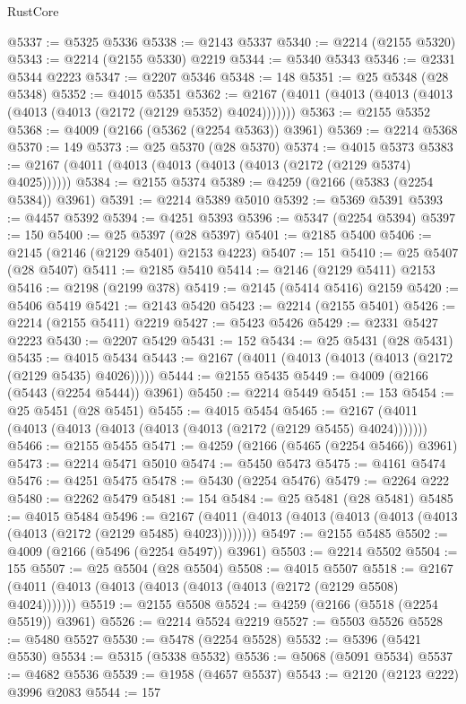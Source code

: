 \begin{lexlean}{RustCore}
\begin{coremodule}
@5337 := @5325 @5336
@5338 := @2143 @5337
@5340 := @2214 (@2155 @5320)
@5343 := @2214 (@2155 @5330) @2219
@5344 := @5340 @5343
@5346 := @2331 @5344 @2223
@5347 := @2207 @5346
@5348 := 148
@5351 := @25 @5348 (@28 @5348)
@5352 := @4015 @5351
@5362 := @2167 (@4011 (@4013 (@4013 (@4013 (@4013 (@4013 (@2172 (@2129 @5352) @4024)))))))
@5363 := @2155 @5352
@5368 := @4009 (@2166 (@5362 (@2254 @5363)) @3961)
@5369 := @2214 @5368
@5370 := 149
@5373 := @25 @5370 (@28 @5370)
@5374 := @4015 @5373
@5383 := @2167 (@4011 (@4013 (@4013 (@4013 (@4013 (@2172 (@2129 @5374) @4025))))))
@5384 := @2155 @5374
@5389 := @4259 (@2166 (@5383 (@2254 @5384)) @3961)
@5391 := @2214 @5389 @5010
@5392 := @5369 @5391
@5393 := @4457 @5392
@5394 := @4251 @5393
@5396 := @5347 (@2254 @5394)
@5397 := 150
@5400 := @25 @5397 (@28 @5397)
@5401 := @2185 @5400
@5406 := @2145 (@2146 (@2129 @5401) @2153 @4223)
@5407 := 151
@5410 := @25 @5407 (@28 @5407)
@5411 := @2185 @5410
@5414 := @2146 (@2129 @5411) @2153
@5416 := @2198 (@2199 @378)
@5419 := @2145 (@5414 @5416) @2159
@5420 := @5406 @5419
@5421 := @2143 @5420
@5423 := @2214 (@2155 @5401)
@5426 := @2214 (@2155 @5411) @2219
@5427 := @5423 @5426
@5429 := @2331 @5427 @2223
@5430 := @2207 @5429
@5431 := 152
@5434 := @25 @5431 (@28 @5431)
@5435 := @4015 @5434
@5443 := @2167 (@4011 (@4013 (@4013 (@4013 (@2172 (@2129 @5435) @4026)))))
@5444 := @2155 @5435
@5449 := @4009 (@2166 (@5443 (@2254 @5444)) @3961)
@5450 := @2214 @5449
@5451 := 153
@5454 := @25 @5451 (@28 @5451)
@5455 := @4015 @5454
@5465 := @2167 (@4011 (@4013 (@4013 (@4013 (@4013 (@4013 (@2172 (@2129 @5455) @4024)))))))
@5466 := @2155 @5455
@5471 := @4259 (@2166 (@5465 (@2254 @5466)) @3961)
@5473 := @2214 @5471 @5010
@5474 := @5450 @5473
@5475 := @4161 @5474
@5476 := @4251 @5475
@5478 := @5430 (@2254 @5476)
@5479 := @2264 @222
@5480 := @2262 @5479
@5481 := 154
@5484 := @25 @5481 (@28 @5481)
@5485 := @4015 @5484
@5496 := @2167 (@4011 (@4013 (@4013 (@4013 (@4013 (@4013 (@4013 (@2172 (@2129 @5485) @4023))))))))
@5497 := @2155 @5485
@5502 := @4009 (@2166 (@5496 (@2254 @5497)) @3961)
@5503 := @2214 @5502
@5504 := 155
@5507 := @25 @5504 (@28 @5504)
@5508 := @4015 @5507
@5518 := @2167 (@4011 (@4013 (@4013 (@4013 (@4013 (@4013 (@2172 (@2129 @5508) @4024)))))))
@5519 := @2155 @5508
@5524 := @4259 (@2166 (@5518 (@2254 @5519)) @3961)
@5526 := @2214 @5524 @2219
@5527 := @5503 @5526
@5528 := @5480 @5527
@5530 := @5478 (@2254 @5528)
@5532 := @5396 (@5421 @5530)
@5534 := @5315 (@5338 @5532)
@5536 := @5068 (@5091 @5534)
@5537 := @4682 @5536
@5539 := @1958 (@4657 @5537)
@5543 := @2120 (@2123 @222) @3996 @2083
@5544 := 157

\end{coremodule}
\end{lexlean}
